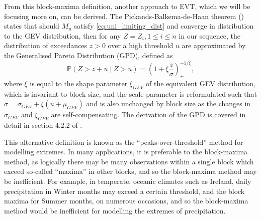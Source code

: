 \documentclass{article}
\numberwithin{equation}{section}
\begin{document}
From this block-maxima definition, another approach to EVT, which we will be focusing more on, can be derived.
The Pickands-Balkema-de-Haan theorem (\cite{Pickands1975, Balkema1974}) states that should $M_n$ satisfy \ref{eq:uni_limiting_dist} and converge in distribution to the GEV distribution, then for any $Z = Z_i, 1 \le i \le n$ in our sequence, the distribution of exceedances $z > 0$ over a high threshold $u$ are approximated by the Generalised Pareto Distribution (GPD), defined as
\begin{equation} \label{eq:gpd}
  \mathbb{P}(Z > z + u \mid Z > u) = \left(1 + \xi \frac{z}{\sigma} \right)_{+}^{-1/\xi},
\end{equation}
where $\xi$ is equal to the shape parameter $\xi_{GEV}$ of the equivalent GEV distribution, which is invariant to block size, and the scale parameter is reformulated such that $\sigma = \sigma_{GEV} + \xi(u + \mu_{GEV})$ and is also unchanged by block size as the changes in $\sigma_{GEV}$ and $\xi_{GEV}$ are self-compensating. %
The derivation of the GPD is covered in detail in section 4.2.2 of \citet{Coles2001}. 

This alternative definition is known as the ``peaks-over-threshold'' method for modelling extremes. 
In many applications, it is preferable to the block-maxima method, as logically there may be many observations within a single block which exceed so-called ``maxima'' in other blocks, and so the block-maxima method may be inefficient.
For example, in temperate, oceanic climates such as Ireland, daily precipitation in Winter months may exceed a certain threshold, and the block maxima for Summer months, on numerous occasions, and so the block-maxima method would be inefficient for modelling the extremes of precipitation.

\end{document}
